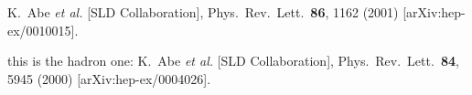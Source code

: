 K.~Abe {\it et al.}  [SLD Collaboration],
Phys.\ Rev.\ Lett.\  {\bf 86}, 1162 (2001)
[arXiv:hep-ex/0010015].

this is the hadron one:
K.~Abe {\it et al.}  [SLD Collaboration],
Phys.\ Rev.\ Lett.\  {\bf 84}, 5945 (2000)
[arXiv:hep-ex/0004026].
